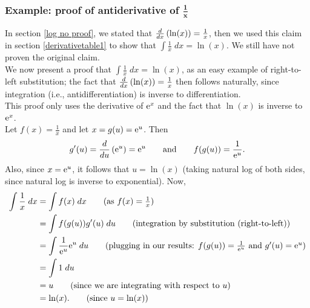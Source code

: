 \subsubsection{Example: proof of antiderivative of $\boldsymbol{\frac{1}{x}}$}

\noindent In section \ref{log no proof}, we stated that $\frac{d}{dx}\left(\ln(x)\right) = \frac{1}{x}$, then we used this claim in section \ref{derivativetable1} to show that $\int \frac{1}{x} \; dx = \ln(x)$. We still have not proven the original claim. \\

\noindent We now present a proof that $\int \frac{1}{x} \; dx = \ln(x)$, as an easy example of right-to-left substitution; the fact that $\frac{d}{dx}\left(\ln(x)\right) = \frac{1}{x}$ then follows naturally, since integration (i.e., antidifferentiation) is inverse to differentiation. \\ 

\noindent This proof only uses the derivative of $\mathrm{e}^x$ and the fact that $\ln(x)$ is inverse to $\mathrm{e}^x$. \\

\noindent Let $f(x) = \frac{1}{x}$ and let $x = g(u) = \mathrm{e}^u$. Then
\[
g'(u) = \frac{d}{du}\left(\mathrm{e}^u\right) = \mathrm{e}^u \qquad \text{and} \qquad f(g(u)) = \frac{1}{\mathrm{e}^u}. 
\]
Also, since $x = \mathrm{e}^u$, it follows that $u = \ln(x)$ (taking natural log of both sides, since natural log is inverse to exponential). Now,
\begin{align*}
\int \frac{1}{x} \; dx & = \int f(x) \; dx \tag{as $f(x) = \frac{1}{x}$} \\
	& = \int f(g(u))g'(u) \; du \tag{integration by substitution (right-to-left)} \\
	& = \int \frac{1}{\e^u} \e^u \; du \tag{plugging in our results: $f(g(u)) = \frac{1}{\e^u}$ and $g'(u) = \e^u$} \\
	& = \int 1 \; du \\
	& = u \tag{since we are integrating with respect to $u$}\\
	& = \ln(x). \tag{since $u = \ln(x)$}
\end{align*}

